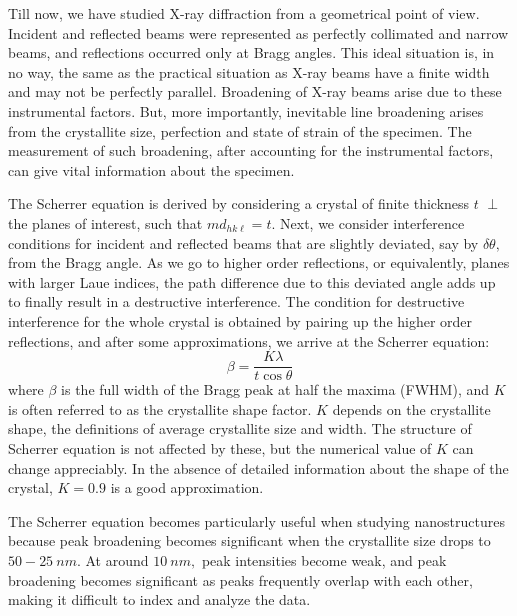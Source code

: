 	Till now, we have studied X-ray diffraction from a geometrical point of view. Incident and reflected beams were represented as perfectly collimated and narrow beams, and reflections occurred only at Bragg angles. This ideal situation is, in no way, the same as the practical situation as X-ray beams have a finite width and may not be perfectly parallel. Broadening of X-ray beams arise due to these instrumental factors. But, more importantly, inevitable line broadening arises from the crystallite size, perfection and state of strain of the specimen. The measurement of such broadening, after accounting for the instrumental factors, can give vital information about the specimen.
	
	The Scherrer equation is derived by considering a crystal of finite thickness $t$ $\perp$ the planes of interest, such that $m d_{h k \ell} = t.$ Next, we consider interference conditions for incident and reflected beams that are slightly deviated, say by $\delta \theta,$ from the Bragg angle. As we go to higher order reflections, or equivalently, planes with larger Laue indices, the path difference due to this deviated angle adds up to finally result in a destructive interference. The condition for destructive interference for the whole crystal is obtained by pairing up the higher order reflections, and after some approximations, we arrive at the Scherrer equation:%
%		
	\begin{equation}
	\beta = \dfrac{K \lambda}{t \cos \theta}
	\end{equation}%
%	
	where $\beta$ is the full width of the Bragg peak at half the maxima (FWHM), and $K$ is often referred \cite{Klug1974} to as the crystallite shape factor. $K$ depends \cite{Holzwarth2011} on the crystallite shape, the definitions of average crystallite size and width. The structure of Scherrer equation is not affected by these, but the numerical value of $K$ can change appreciably. In the absence of detailed information about the shape of the crystal, $K = 0.9$ is a good approximation.
	
	The Scherrer equation becomes particularly useful when studying nanostructures because peak broadening becomes significant \cite{AkankshaUrade2023} when the crystallite size drops to $50-25~\si{nm}.$ At around $\SI{10}{nm},$ peak intensities become weak, and peak broadening becomes significant as peaks frequently overlap with each other, making it difficult to index and analyze the data.